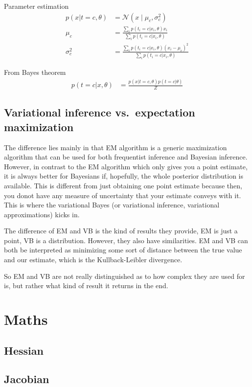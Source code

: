 \documentclass{book}
\begin{document}
Parameter estimation
\begin{align*}
p(x | t=c, \theta) &= \mathcal{N}(x\mid \mu_c ,\sigma^{2}_{c}) \\
\mu_c  &= \frac{\sum_i p(t_i = c | x_i, \theta) x_i}{\sum_i p(t_i = c | x_i, \theta)} \\
\sigma^{2}_{c} &= \frac{\sum_i p(t_i = c | x_i, \theta) (x_i - \mu_c)^2}{\sum_i p(t_i = c | x_i, \theta)}
\end{align*}

From Bayes theorem
\begin{align*}
p(t=c | x, \theta) &= \frac{p(x | t=c, \theta) p(t=c | \theta)}{Z}
\end{align*}

\section{Variational inference vs.\ expectation maximization}
The difference lies mainly in that EM algorithm is a generic maximization algorithm that can be used for both frequentist inference and Bayesian inference. However, in contrast to the EM algorithm which only gives you a point estimate, it is always better for Bayesians if, hopefully, the whole posterior distribution is available. This is different from just obtaining one point estimate because then, you donot have any measure of uncertainty that your estimate conveys with it. This is where the variational Bayes (or variational inference, variational approximations) kicks in.

The difference of EM and VB is the kind of results they provide, EM is just a point, VB is a distribution. However, they also have similarities. EM and VB can both be interpreted as minimizing some sort of distance between the true value and our estimate, which is the Kullback-Leibler divergence.

So EM and VB are not really distinguished as to how complex they are used for is, but rather what kind of result it returns in the end.

\chapter{Maths}

\section{Hessian}

\section{Jacobian}

\newpage
\renewcommand{\cftchapdotsep}{\cftdotsep}
\tableofcontents


\newpage

 
\end{document}

